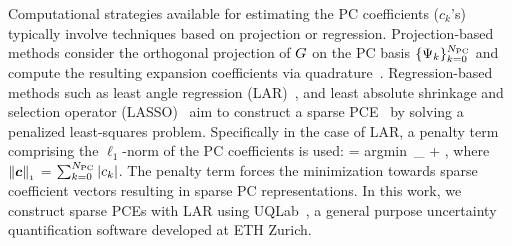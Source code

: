 Computational strategies available for estimating the PC coefficients
($c_k$'s) typically involve techniques based on projection or regression.
Projection-based methods consider the orthogonal projection of 
$G$ on the PC basis $\{\Psi_k\}_{k=0}^{N_\text{PC}}$ and compute
the resulting expansion coefficients via quadrature~\cite{Olivier:2010}.
Regression-based methods such as least angle regression (LAR)~\cite{Efron:2004}, and least absolute shrinkage
and selection operator (LASSO)~\cite{Tibshirani:1996} aim to construct a sparse PCE~\cite{Blatman:2008}
by solving a penalized least-squares problem. Specifically in the case of LAR, a penalty term comprising the $\ell_1$-norm of the PC coefficients is used:
\be
{} = \mbox{argmin}~_{\bm\theta}
\left[\left(\sum_{k=0}^\Npc c_k \Psi_k(\bm\xi(\bm\theta)) -
\GG(\bm{\theta})\right)^{2}\right]  + \lambda{},
\label{eq:reg}
\ee
where $\left\| {\bm{c}} \right\|_{\scriptscriptstyle 1}$ = $\sum_{k=0}^{N_\text{PC}} |c_k |$.
The penalty term forces the minimization towards sparse coefficient vectors
resulting in sparse PC representations.  In this work, we construct sparse PCEs
with LAR using UQLab~\cite{Marelli:2014}, a general purpose uncertainty
quantification software developed at ETH Zurich.


















